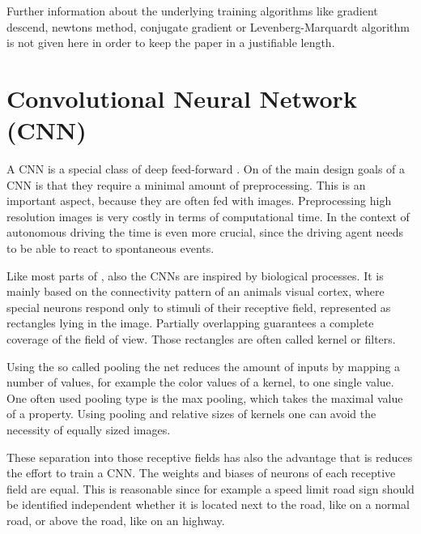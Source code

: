 Further information about the underlying training algorithms like gradient descend, newtons method, conjugate gradient or Levenberg-Marquardt algorithm is not given here in order to keep the paper in a justifiable length.  


\section{Convolutional Neural Network (CNN)}\label{sec:CNN}

A CNN is a special class of deep feed-forward \nns. On of the main design goals of a CNN is that they require a minimal amount of preprocessing. This is an important aspect, because they are often fed with images. Preprocessing high resolution images is very costly in terms of computational time. In the context of autonomous driving the time is even more crucial, since the driving agent needs to be able to react to spontaneous events.

Like most parts of \nns, also the CNNs are inspired by biological processes. It is mainly based on the connectivity pattern of an animals visual cortex, where special neurons respond only to stimuli of their receptive field, represented as rectangles lying in the image. Partially overlapping guarantees a complete coverage of the field of view. Those rectangles are often called kernel or filters.\cite{matsugu2003subject}


Using the so called pooling the net reduces the amount of inputs by mapping a number of values, for example the color values of a kernel, to one single value. One often used pooling type is the max pooling, which takes the maximal value of a property. Using pooling and relative sizes of kernels one can avoid the necessity of equally sized images. \cite{wiki:CNN} 

These separation into those receptive fields has also the advantage that is reduces the effort to train a CNN. The weights and biases of neurons of each receptive field are equal. This is reasonable since for example a speed limit road sign should be identified independent whether it is located next to the road, like on a normal road, or above the road, like on an highway. \cite{lecun2015lenet}

